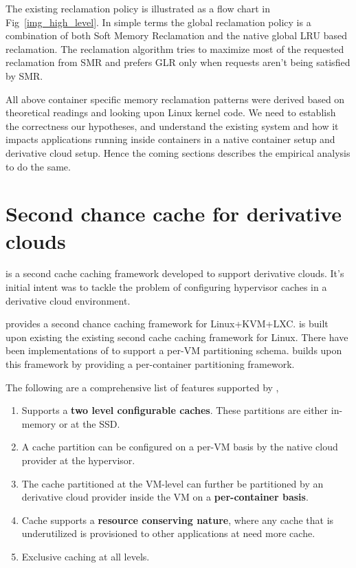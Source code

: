       The existing reclamation policy is illustrated as a flow chart in Fig~\ref{img_high_level}. In simple terms the global reclamation 
policy is a combination of both Soft Memory Reclamation and the native global LRU based reclamation. The reclamation algorithm tries to 
maximize most of the requested reclamation from SMR and prefers GLR only when requests aren't being satisfied by SMR.

      All above container specific memory reclamation patterns were derived based on theoretical readings and looking upon Linux kernel 
code. We need to establish the correctness our hypotheses, and understand the existing system and how it impacts applications running 
inside containers in a native container setup and derivative cloud setup. Hence the coming sections describes the empirical analysis to 
do the same.
      
  
  \section{Second chance cache for derivative clouds}
  
    \dd{}\cite{doubledecker} is a second cache caching framework developed to support derivative clouds. It's initial intent was to tackle the
    problem of configuring hypervisor caches in a derivative cloud environment. 
    
    \dd{} provides a second chance caching framework for Linux+KVM+LXC.
    \dd{} is built upon existing the existing \tmem{} second cache caching framework for Linux. There have been implementations\cite{venkatesan2014ex} of \tmem{} 
    to support a per-VM partitioning schema. \dd{} builds upon this framework by providing a per-container partitioning framework.
    
    \noindent The following are a comprehensive list of features supported by \dd{},
      \begin{enumerate}
	\item Supports a \textbf{two level configurable caches}. These partitions are either in-memory or at the SSD. 
	\item A cache partition can be configured on a per-VM basis by the native cloud provider at the hypervisor.
	\item The cache partitioned at the VM-level can further be partitioned by an derivative cloud provider inside the VM on a \textbf{per-container basis}.
	\item Cache supports a \textbf{resource conserving nature}, where any cache that is underutilized is provisioned to other applications at need
	more cache.
	\item Exclusive caching at all levels.
      \end{enumerate}
      
